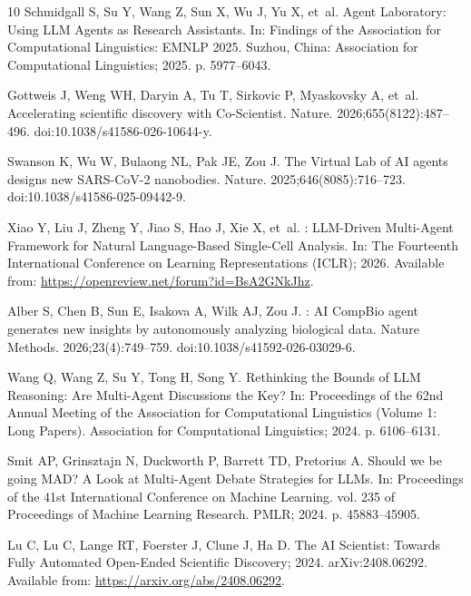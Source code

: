 \documentclass[10pt,letterpaper]{article}
\begin{document}
\begin{thebibliography}{10}
Schmidgall S, Su Y, Wang Z, Sun X, Wu J, Yu X, et~al.
\newblock Agent Laboratory: Using {LLM} Agents as Research Assistants.
\newblock In: Findings of the Association for Computational Linguistics: EMNLP
  2025. Suzhou, China: Association for Computational Linguistics; 2025. p.
  5977--6043.

Gottweis J, Weng WH, Daryin A, Tu T, Sirkovic P, Myaskovsky A, et~al.
\newblock Accelerating scientific discovery with {Co-Scientist}.
\newblock Nature. 2026;655(8122):487--496.
\newblock doi:{10.1038/s41586-026-10644-y}.

Swanson K, Wu W, Bulaong NL, Pak JE, Zou J.
\newblock The {Virtual Lab} of {AI} agents designs new {SARS-CoV-2} nanobodies.
\newblock Nature. 2025;646(8085):716--723.
\newblock doi:{10.1038/s41586-025-09442-9}.

Xiao Y, Liu J, Zheng Y, Jiao S, Hao J, Xie X, et~al.
: {LLM}-Driven Multi-Agent Framework for Natural
  Language-Based Single-Cell Analysis.
\newblock In: The Fourteenth International Conference on Learning
  Representations (ICLR); 2026. Available from:
  \url{https://openreview.net/forum?id=BsA2GNkJhz}.

Alber S, Chen B, Sun E, Isakova A, Wilk AJ, Zou J.
: {AI} {CompBio} agent generates new insights by
  autonomously analyzing biological data.
\newblock Nature Methods. 2026;23(4):749--759.
\newblock doi:{10.1038/s41592-026-03029-6}.

Wang Q, Wang Z, Su Y, Tong H, Song Y.
\newblock Rethinking the Bounds of {LLM} Reasoning: Are Multi-Agent Discussions
  the Key?
\newblock In: Proceedings of the 62nd Annual Meeting of the Association for
  Computational Linguistics (Volume 1: Long Papers). Association for
  Computational Linguistics; 2024. p. 6106--6131.

Smit AP, Grinsztajn N, Duckworth P, Barrett TD, Pretorius A.
\newblock Should we be going {MAD}? {A} Look at Multi-Agent Debate Strategies
  for {LLMs}.
\newblock In: Proceedings of the 41st International Conference on Machine
  Learning. vol. 235 of Proceedings of Machine Learning Research. PMLR; 2024.
  p. 45883--45905.

Lu C, Lu C, Lange RT, Foerster J, Clune J, Ha D. The {AI} {Scientist}: Towards
  Fully Automated Open-Ended Scientific Discovery; 2024.
\newblock arXiv:2408.06292.
\newblock Available from: \url{https://arxiv.org/abs/2408.06292}.


\end{thebibliography}
\end{document}

